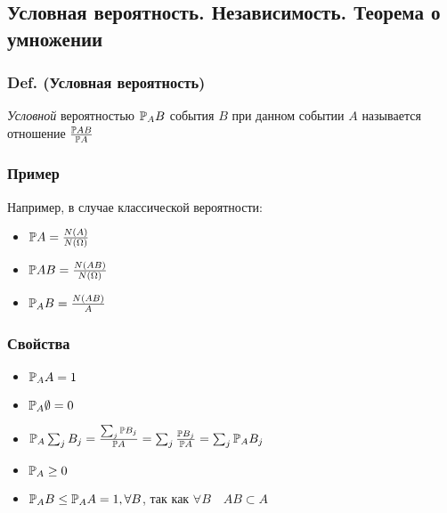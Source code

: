 \subsection{Условная вероятность. Независимость. Теорема о
умножении}\label{ux443ux441ux43bux43eux432ux43dux430ux44f-ux432ux435ux440ux43eux44fux442ux43dux43eux441ux442ux44c.-ux43dux435ux437ux430ux432ux438ux441ux438ux43cux43eux441ux442ux44c.-ux442ux435ux43eux440ux435ux43cux430-ux43e-ux443ux43cux43dux43eux436ux435ux43dux438ux438}

\subsubsection{Def. (Условная
вероятность)}\label{def.-ux443ux441ux43bux43eux432ux43dux430ux44f-ux432ux435ux440ux43eux44fux442ux43dux43eux441ux442ux44c}

\emph{Условной} вероятностью \(\mathbb P_A B\) события \(B\) при данном
событии \(A\) называется отношение \(\frac{\mathbb P AB}{\mathbb P A}\)

\subsubsection{Пример}\label{ux43fux440ux438ux43cux435ux440}

Например, в случае классической вероятности:

\begin{itemize}

\item
  \(\mathbb P A = \frac{N(A)} {N(\Omega)}\)
\item
  \(\mathbb P AB = \frac{N(AB)}{N(\Omega)}\)
\item
  \(\mathbb P_A B = \frac{N(AB)}{A}\)
\end{itemize}

\subsubsection{Свойства}\label{ux441ux432ux43eux439ux441ux442ux432ux430}

\begin{itemize}

\item
  \(\mathbb P_A A = 1\)
\item
  \(\mathbb P_A \emptyset = 0\)
\item
  \(\mathbb P_A \sum_j B_j = \frac{\sum_j \mathbb P B_j}{\mathbb P A} = \sum_j \frac{\mathbb P B_j}{\mathbb P A} = \sum_j \mathbb P_A B_j\)
\item
  \(\mathbb P_A \geq 0\)
\item
  \(\mathbb P_A B \leq \mathbb P_A A = 1, \forall B\), \quad так как
  \(\forall B \quad AB\subset A\)
\end{itemize}


